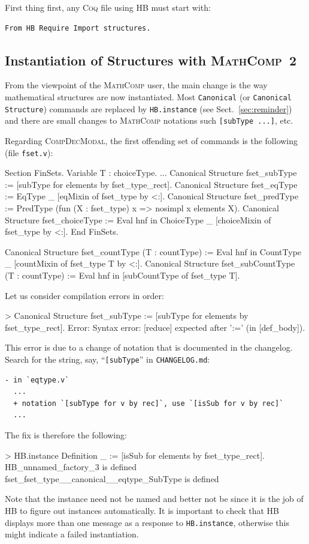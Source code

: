 \documentclass{article}
\def\coq{\textsc{Coq}}
\def\mathcomp{\textsc{MathComp}}
\def\hb{\textsc{HB}}
\def\compdecmodal{\textsc{CompDecModal}}
\def\coqin#1{\texttt{#1}}
\begin{document}
First thing first, any \coq{} file using \hb{} must start with:
\begin{verbatim}
From HB Require Import structures.
\end{verbatim}

\subsection{Instantiation of Structures with \mathcomp~2}

From the viewpoint of the \mathcomp{} user, the main change is the way
mathematical structures are now instantiated. Most \coqin{Canonical}
(or \coqin{Canonical Structure}) commands are replaced by
\coqin{HB.instance} (see Sect.~\ref{sec:reminder}) and there are small
changes to \mathcomp{} notations such \coqin{[subType ...]}, etc.

Regarding \compdecmodal, the first offending set of commands is the
following (file \coqin{fset.v}):
\begin{failure}
Section FinSets.
 Variable T : choiceType.
 ...
 Canonical Structure fset_subType := [subType for elements by fset_type_rect].
 Canonical Structure fset_eqType := EqType _ [eqMixin of fset_type by <:].
 Canonical Structure fset_predType := PredType (fun (X : fset_type) x => nosimpl x \in elements X).
 Canonical Structure fset_choiceType := Eval hnf in ChoiceType _ [choiceMixin of fset_type by <:].
End FinSets.

Canonical Structure fset_countType (T : countType) :=
  Eval hnf in CountType _ [countMixin of fset_type T by <:].
Canonical Structure fset_subCountType (T : countType) :=
  Eval hnf in [subCountType of fset_type T].
\end{failure}

Let us consider compilation errors in order:
\begin{failure}
> Canonical Structure fset_subType := [subType for elements by fset_type_rect].
Error: Syntax error: [reduce] expected after ':=' (in [def_body]).
\end{failure}
This error is due to a change of notation that is documented in the
changelog.  Search for the string, say, ``\coqin{[subType}'' in
\coqin{CHANGELOG.md}:
\begin{verbatim}
- in `eqtype.v`
  ...
  + notation `[subType for v by rec]`, use `[isSub for v by rec]`
  ...
\end{verbatim}
The fix is therefore the following:
\begin{success}
> HB.instance Definition _ := [isSub for elements by fset_type_rect].
HB_unnamed_factory_3 is defined
fset_fset_type__canonical__eqtype_SubType is defined
\end{success}
Note that the instance need not be named and better not be since it is
the job of \hb{} to figure out instances automatically.
%
It is important to check that \hb{} displays more than one message as
a response to \coqin{HB.instance}, otherwise this might indicate a
failed instantiation.
\end{document}
